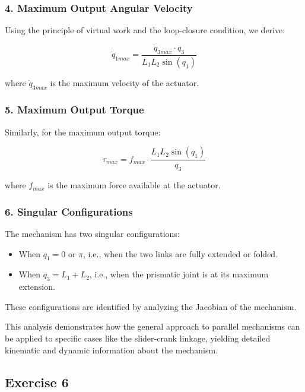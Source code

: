 \begin{solution}
    
    \subsubsection*{4. Maximum Output Angular Velocity}
    
    Using the principle of virtual work and the loop-closure condition, we derive:
    
    \begin{equation}
    \dot{q}_{1max} = \frac{\dot{q}_{3max} \cdot q_3}{L_1L_2\sin(q_1)}
    \end{equation}
    
    where $\dot{q}_{3max}$ is the maximum velocity of the actuator.
    
    \subsubsection*{5. Maximum Output Torque}
    
    Similarly, for the maximum output torque:
    
    \begin{equation}
    \tau_{max} = f_{max} \cdot \frac{L_1L_2\sin(q_1)}{q_3}
    \end{equation}
    
    where $f_{max}$ is the maximum force available at the actuator.
    
    \subsubsection*{6. Singular Configurations}
    
    The mechanism has two singular configurations:
    \begin{itemize}
        \item When $q_1 = 0$ or $\pi$, i.e., when the two links are fully extended or folded.
        \item When $q_3 = L_1 + L_2$, i.e., when the prismatic joint is at its maximum extension.
    \end{itemize}
    
    These configurations are identified by analyzing the Jacobian of the mechanism.
    
    This analysis demonstrates how the general approach to parallel mechanisms can be applied to specific cases like the slider-crank linkage, yielding detailed kinematic and dynamic information about the mechanism.
    \end{solution}
\subsection{Exercise 6}
\lipsum[11]

